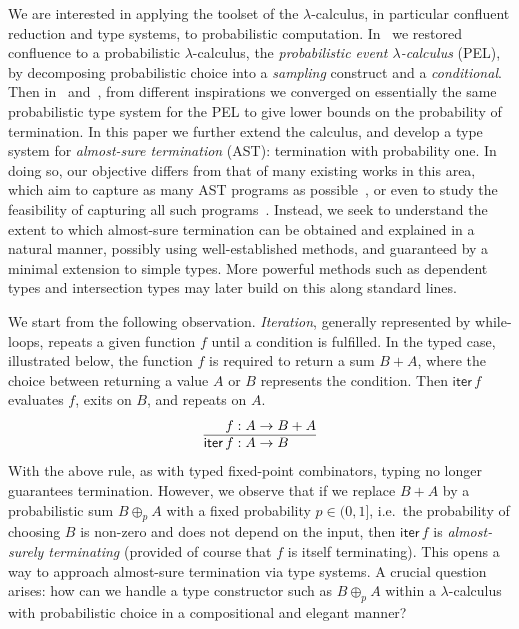 \documentclass[a4paper,UKenglish,cleveref, autoref, thm-restate]{lipics-v2021}
\begin{document}
We are interested in applying the toolset of the $\lambda$-calculus, in particular confluent reduction and type systems, to probabilistic computation. In~\cite{DalLago-Guerrieri-Heijltjes-2020} we restored confluence to a probabilistic $\lambda$-calculus, the \emph{probabilistic event $\lambda$-calculus} (PEL), by decomposing probabilistic choice into a \emph{sampling} construct and a \emph{conditional}. Then in~\cite{Antonelli-DalLago-Pistone-2022} and~\cite{Heijltjes-Majury-2025}, from different inspirations we converged on essentially the same probabilistic type system for the PEL to give lower bounds on the probability of termination. In this paper we further extend the calculus, and develop a type system for \emph{almost-sure termination} (AST): termination with probability one. In doing so, our objective differs from that of many existing works in this area, which aim to capture as many AST programs as possible~\cite{DalLago-Grellois-2019,DalLago-Faggian-Ronchi-2021}, or even to study the feasibility of capturing all such programs~\cite{Kobayashi-DalLago-Grellois-2020}. Instead, we seek to understand the extent to which almost-sure termination can be obtained and explained in a natural manner, possibly using well-established methods, and guaranteed by a minimal extension to simple types. More powerful methods such as dependent types and intersection types may later build on this along standard lines.

We start from the following observation. \emph{Iteration}, generally represented by while-loops, repeats a given function $f$ until a condition is fulfilled. In the typed case, illustrated  below, the function $f$ is required to return a sum $B+A$, where the choice between returning a value $A$ or $B$ represents the condition. Then $\mathsf{iter}\,f$ evaluates $f$, exits on $B$, and repeats on $A$.
\[
\begin{array}{@{}r@{}l@{}}
	f &{}: A \to B+A
\\ \hline
	\mathsf{iter}\,f &{}: A\to B
\end{array}
\]
With the above rule, as with typed fixed-point combinators, typing no longer guarantees termination. However, we observe that if we replace $B+A$ by a probabilistic sum $B \oplus_p A$ with a fixed probability $p\in (0,1]$, i.e.\ the probability of choosing $B$ is non-zero and does not depend on the input, then $\mathsf{iter}\,f$ is \emph{almost-surely terminating} (provided of course that $f$ is itself terminating). This opens a way to approach almost-sure termination via type systems. A crucial question arises: how can we handle a type constructor such as $B\oplus_p A$ within a $\lambda$-calculus with probabilistic choice in a compositional and elegant manner?
\end{document}
